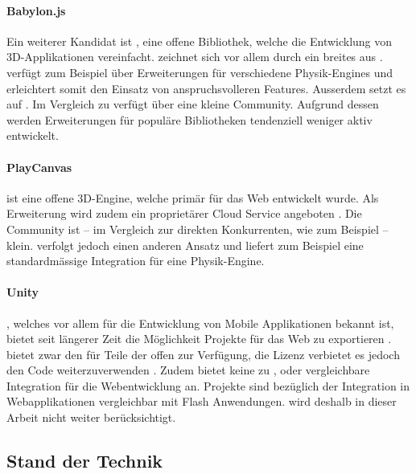 \paragraph{Babylon.js}
Ein weiterer Kandidat ist , eine offene Bibliothek, welche die Entwicklung von 3D-Applikationen vereinfacht.  zeichnet sich vor allem durch ein breites  aus \cite{babylonjsNpmPackage}.  verfügt zum Beispiel über Erweiterungen für verschiedene Physik-Engines und erleichtert somit den Einsatz von anspruchsvolleren Features. Ausserdem setzt es auf .
Im Vergleich zu  verfügt  über eine kleine Community. Aufgrund dessen werden Erweiterungen für populäre Bibliotheken tendenziell weniger aktiv entwickelt.

\paragraph{PlayCanvas}
 ist eine offene 3D-Engine, welche primär für das Web entwickelt wurde. Als Erweiterung wird zudem ein proprietärer Cloud Service angeboten \cite{playcanvasNpmPackage}. Die Community ist – im Vergleich zur direkten Konkurrenten, wie zum Beispiel  – klein.  verfolgt jedoch einen anderen Ansatz und liefert zum Beispiel eine standardmässige Integration für eine Physik-Engine.

\paragraph{Unity}
, welches vor allem für die Entwicklung von Mobile Applikationen bekannt ist, bietet seit längerer Zeit die Möglichkeit Projekte für das Web zu exportieren \cite{unityWeb}.
 bietet zwar den  für Teile der  offen zur Verfügung, die Lizenz verbietet es jedoch den Code weiterzuverwenden \cite{unityOpenSource}.
Zudem bietet  keine zu ,  oder  vergleichbare Integration für die Webentwicklung an.  Projekte sind bezüglich der Integration in Webapplikationen vergleichbar mit Flash Anwendungen.  wird deshalb in dieser Arbeit nicht weiter berücksichtigt.

\subsection{Stand der Technik}

